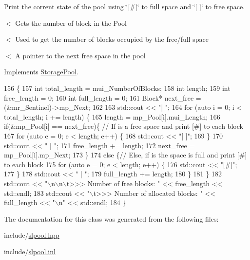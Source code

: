 Print the corrent state of the pool using \char`\"{}\mbox{[}\#\mbox{]}\char`\"{} to full space and \char`\"{}\mbox{[} \mbox{]}\char`\"{} to free space. 

$<$ Gets the number of block in the Pool

$<$ Used to get the number of blocks occupied by the free/full space

$<$ A pointer to the next free space in the pool 

Implements \hyperlink{class_storage_pool}{Storage\+Pool}.


\begin{DoxyCode}
156                  \{
157       \textcolor{keywordtype}{int} total\_length = mui\_NumberOfBlocks; 
158     \textcolor{keywordtype}{int} length; 
159     \textcolor{keywordtype}{int} free\_length = 0;
160     \textcolor{keywordtype}{int} full\_length = 0;
161     Block* next\_free = (&mr\_Sentinel)->mp\_Next; 
162 
163     std::cout << \textcolor{stringliteral}{"| "};
164     \textcolor{keywordflow}{for} (\textcolor{keyword}{auto} i = 0; i < total\_length; i += length) \{
165         length = mp\_Pool[i].mui\_Length;
166         \textcolor{keywordflow}{if}(&mp\_Pool[i] == next\_free)\{ \textcolor{comment}{// If is a free space and print [#] to each block}
167             \textcolor{keywordflow}{for} (\textcolor{keyword}{auto} e = 0; e < length; e++) \{
168                     std::cout << \textcolor{stringliteral}{"[ ]"};
169             \}
170             std::cout << \textcolor{stringliteral}{" | "};
171             free\_length += length;
172             next\_free = mp\_Pool[i].mp\_Next;
173         \}
174         \textcolor{keywordflow}{else} \{\textcolor{comment}{// Else, if is the space is full and print [#] to each block}
175             \textcolor{keywordflow}{for} (\textcolor{keyword}{auto} e = 0; e < length; e++) \{
176                 std::cout << \textcolor{stringliteral}{"[#]"};
177             \}
178             std::cout << \textcolor{stringliteral}{" | "};
179             full\_length += length;
180         \}
181     \}
182      std::cout << \textcolor{stringliteral}{"\(\backslash\)n\(\backslash\)n\(\backslash\)t>>> Number of free blocks: "} << free\_length << std::endl;
183      std::cout << \textcolor{stringliteral}{"\(\backslash\)t>>> Number of allocated blocks: "} << full\_length << \textcolor{stringliteral}{"\(\backslash\)n"} << std::endl;
184 \}
\end{DoxyCode}


The documentation for this class was generated from the following files\+:\begin{DoxyCompactItemize}
\item 
include/\hyperlink{slpool_8hpp}{slpool.\+hpp}\item 
include/\hyperlink{slpool_8inl}{slpool.\+inl}\end{DoxyCompactItemize}
